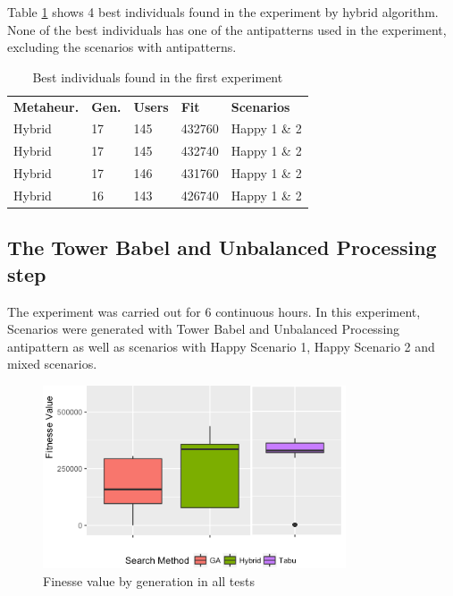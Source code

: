 \documentclass[espaco=umemeio,chapter=TITLE,twoside,openright]{abnt}
\begin{document}
Table \ref{tab:bestindividuals} shows 4 best individuals found in the experiment by hybrid algorithm. None of the best individuals has one of the antipatterns used in the experiment, excluding the scenarios with antipatterns.

\begin{table}[h]
\centering
\caption{Best individuals found in the first experiment}
\label{tab:bestindividuals}
\begin{tabular}{lllll}
\rowcolor[HTML]{C0C0C0}
\textbf{Metaheur.} & \textbf{Gen.} & \textbf{Users} & \textbf{Fit} & \textbf{Scenarios}  \\
Hybrid & 17 & 145 & 432760 & Happy 1 \& 2  \\
Hybrid & 17 & 145 & 432740 & Happy 1 \& 2   \\
Hybrid & 17 & 146 & 431760 & Happy 1 \& 2  \\
Hybrid & 16 & 143 & 426740 & Happy 1 \& 2
\end{tabular}
\end{table}



\subsection{The Tower Babel  and Unbalanced Processing step}


The experiment was carried out for 6 continuous hours. In this experiment, Scenarios were generated with Tower Babel and Unbalanced Processing antipattern as well as scenarios with Happy Scenario 1, Happy Scenario 2 and mixed scenarios.

\begin{figure}[h]
\centering
\includegraphics[width=0.8\textwidth]{./images/antipattern2.png}
\caption{Finesse value by generation in all tests}
\label{fig:boxplot2}
\end{figure}
\end{document}
